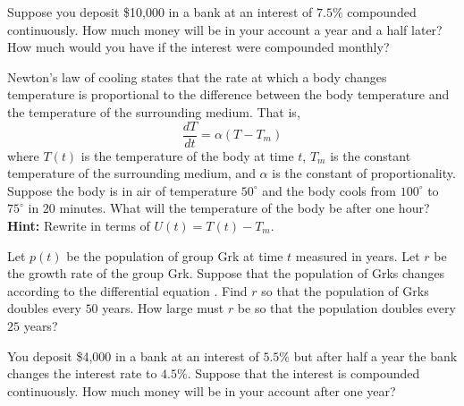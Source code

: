\documentclass{ximera}
\begin{document}
\begin{exercise} \label{c3.1.4}
Suppose you deposit \$10,000 in a bank at an
interest of $7.5\%$ compounded continuously.
How much money will be in your account a year and a half later?
How much would you have if the interest were compounded monthly?
\end{exercise}

\begin{exercise} \label{c3.1.5} 
Newton's law of cooling states that the rate at which a body changes
temperature is proportional to the difference between the body
temperature and the temperature of the surrounding medium.  That is,
\begin{equation}  \label{e:Newton}
\frac{dT}{dt} = \alpha(T-T_m)
\end{equation}
where $T(t)$ is the temperature of the body at time $t$, $T_m$ is the
constant temperature of the surrounding medium, and $\alpha$ is the
constant of proportionality.  Suppose the
body is in air of temperature $50^\circ$ and the body cools from
$100^\circ$ to $75^\circ$ in $20$ minutes.  What will the temperature
of the body be after one hour?  {\bf Hint:} Rewrite  in
terms of $U(t) = T(t) - T_m$.
\end{exercise}

\begin{exercise} \label{c3.1.6}
Let $p(t)$ be the population of group Grk at time $t$ measured in years.
Let $r$ be the growth rate of the group Grk.  Suppose that the population
of Grks changes according to the differential equation .
Find $r$ so that the population of Grks doubles every $50$ years.  How
large must $r$ be so that the population doubles every $25$ years?
\end{exercise}

\begin{exercise} \label{c3.1.7A}
You deposit \$4,000 in a bank at an interest of $5.5\%$ but after half 
a year the bank changes the interest rate to $4.5\%$.  Suppose that the 
interest is compounded continuously.  How much money will be in your 
account after one year?
\end{exercise}
\end{document}
